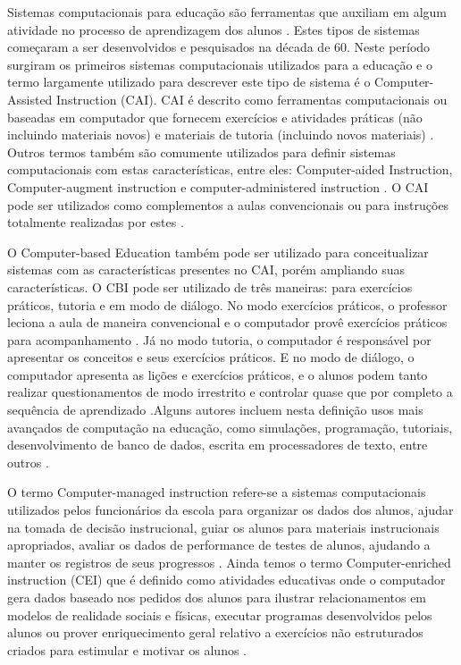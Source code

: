 Sistemas computacionais para educação são ferramentas que auxiliam em algum atividade no processo de aprendizagem dos alunos \cite{Tchounikine, 2011}. Estes tipos de sistemas começaram a ser desenvolvidos e pesquisados na década de 60. Neste período surgiram os primeiros sistemas computacionais utilizados para a educação e o termo largamente utilizado para descrever este tipo de sistema é o Computer-Assisted Instruction (CAI). CAI é descrito como ferramentas computacionais ou baseadas em computador que fornecem exercícios e atividades práticas (não incluindo materiais novos) e materiais de tutoria (incluindo novos materiais) \cite{wheres the proof?}. Outros termos também são comumente utilizados para definir sistemas computacionais com estas características, entre eles: Computer-aided Instruction, Computer-augment instruction e computer-administered instruction \cite{effectiveness of computer based education in elementary schools}. O CAI pode ser utilizados como complementos a aulas convencionais ou para instruções totalmente realizadas por estes \cite{computer assisted instruction cotton}. 

O Computer-based Education também pode ser utilizado para conceitualizar sistemas com as características presentes no CAI, porém ampliando suas características. O CBI pode ser utilizado de três maneiras: para exercícios práticos, tutoria e em modo de diálogo. No modo exercícios práticos, o  professor leciona a aula de maneira convencional e o computador provê exercícios práticos para acompanhamento \cite{wheres the proof}. Já no modo tutoria, o computador é responsável por apresentar os conceitos e seus exercícios práticos. E no modo de diálogo, o computador apresenta as lições e exercícios práticos, e o alunos podem tanto realizar questionamentos de modo irrestrito e controlar quase que por completo a sequência de aprendizado \cite{wheres the proof}.Alguns autores incluem nesta definição usos mais avançados de computação na educação, como simulações, programação, tutoriais, desenvolvimento de banco de dados, escrita em processadores de texto, entre outros \cite{cotton}.

O termo Computer-managed instruction refere-se a sistemas computacionais utilizados pelos funcionários da escola para organizar os dados dos alunos, ajudar na tomada de decisão instrucional, guiar os alunos para materiais instrucionais apropriados, avaliar os dados de performance de testes de alunos, ajudando a manter os registros de seus progressos \cite{cotton, wheres proof}. Ainda temos o termo Computer-enriched instruction (CEI) que é definido como atividades educativas onde o computador gera dados baseado nos pedidos dos alunos para ilustrar relacionamentos em modelos de realidade sociais e físicas, executar programas desenvolvidos pelos alunos ou prover enriquecimento geral relativo a exercícios não estruturados criados para estimular e motivar os alunos \cite{cotton}.

